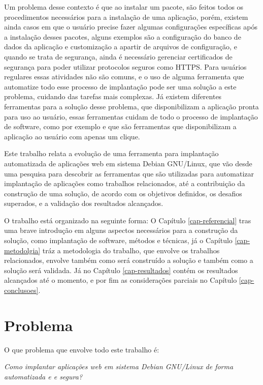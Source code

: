 Um problema desse contexto é que ao instalar um pacote, são feitos todos os
procedimentos necessários para a instalação de uma aplicação, porém, existem
ainda casos em que o usuário precise fazer algumas configurações específicas após
a instalação desses pacotes, alguns exemplos são a configuração do banco de dados
da aplicação e customização a apartir de arquivos de configuração, e quando se
trata de segurança, ainda é necessário gerenciar certificados de segurança para
poder utilizar protocolos seguros como HTTPS. Para usuários regulares essas
atividades não são comuns, e o uso de alguma ferramenta que automatize todo
esse processo de implantação pode ser uma solução a este problema, cuidando das
tarefas mais complexas. Já existem diferentes ferramentas para a solução desse
problema, que disponibilizam a aplicação pronta para uso ao usuário, essas ferramentas
cuidam de todo o processo de implantação de software, como por exemplo \cite{bitnami}
e \cite{sandstormio} que são ferramentas que disponibilizam a aplicação ao
usuário com apenas um clique.

Este trabalho relata a evolução de uma ferramenta para implantação automatizada
de aplicações web em sistema Debian GNU/Linux, que vão desde uma pesquisa para
descobrir as ferramentas que são utilizadas para automatizar implantação de aplicações
como trabalhos relacionados, até a contribuição da construção de uma solução, de
acordo com os objetivos definidos, os desafios superados, e a validação dos
resultados alcançados.

O trabalho está organizado na seguinte forma:  O Capítulo \ref{cap-referencial}
tras uma brave introdução em alguns aspectos necessários para a construção da solução,
como implantação de software, métodos e técnicas, já o Capítulo \ref{cap-metodolgia}
tráz a metodologia do trabalho, que envolve os trabalhos relacionados, envolve também
como será construído a solução e também como a solução será validada. Já no Capítulo
\ref{cap-resultados} contém os resultados alcançados até o momento, e por fim as
considerações parciais no Capítulo \ref{cap-conclusoes}.

\section{Problema}

O que problema que envolve todo este trabalho é:

\begin{center}
  \textit{
  Como implantar aplicações web em sistema Debian GNU/Linux de forma automatizada e
  e segura?
}
\end{center}


